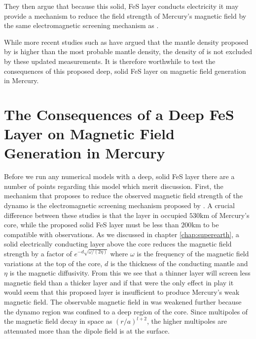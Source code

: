 They then argue that because this solid, FeS layer conducts electricity it may provide a mechanism to reduce the field strength of Mercury's magnetic field by the same electromagnetic screening mechanism as \citet{christensen06}. 

While more recent studies such as \citet{hauck2013} have argued that the mantle density proposed by \citet{smith2012} is higher than the most probable mantle density, the density of \citet{smith2012} is not excluded by these updated measurements. It is therefore worthwhile to test the consequences of this proposed deep, solid FeS layer on magnetic field generation in Mercury.

\section{The Consequences of a Deep FeS Layer on Magnetic Field Generation in Mercury}
Before we run any numerical models with a deep, solid FeS layer there are a number of points regarding this model which merit discussion. First, the mechanism that \citet{smith2012} proposes to reduce the observed magnetic field strength of the dynamo is the electromagnetic screening mechanism proposed by \citet{christensen06}. A crucial difference between these studies is that the layer in \citet{christensen06} occupied $530\textrm{km}$ of Mercury's core, while the proposed solid FeS layer must be less than $200\textrm{km}$ to be compatible with observations. As we discussed in chapter \ref{chap:superearth}, a solid electrically conducting layer above the core reduces the magnetic field strength by a factor of $e^{-d\sqrt{\omega/(2 \eta)}}$ where $\omega$ is the frequency of the magnetic field variations at the top of the core, $d$ is the thickness of the conducting mantle and $\eta$ is the magnetic diffusivity. From this we see that a thinner layer will screen less magnetic field than a thicker layer and if that were the only effect in play it would seem that this proposed layer is insufficient to produce Mercury's weak magnetic field. The observable magnetic field in \citet{christensen06} was weakened further because the dynamo region was confined to a deep region of the core. Since multipoles of the magnetic field decay in space as $\left(r/a\right)^{l+2}$, the higher multipoles are attenuated more than the dipole field is at the surface. 

